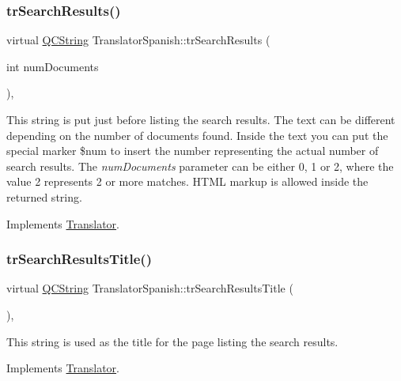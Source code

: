 \subsubsection{\texorpdfstring{trSearchResults()}{trSearchResults()}}
{\footnotesize\ttfamily virtual \mbox{\hyperlink{class_q_c_string}{Q\+C\+String}} Translator\+Spanish\+::tr\+Search\+Results (\begin{DoxyParamCaption}\item[{int}]{num\+Documents }\end{DoxyParamCaption})\hspace{0.3cm}{\ttfamily [inline]}, {\ttfamily [virtual]}}

This string is put just before listing the search results. The text can be different depending on the number of documents found. Inside the text you can put the special marker \$num to insert the number representing the actual number of search results. The {\itshape num\+Documents} parameter can be either 0, 1 or 2, where the value 2 represents 2 or more matches. H\+T\+ML markup is allowed inside the returned string. 

Implements \mbox{\hyperlink{class_translator}{Translator}}.

\mbox{\label{class_translator_spanish_aadf3653bbacc16fdc6980bfc17535cf3}} 
\subsubsection{\texorpdfstring{trSearchResultsTitle()}{trSearchResultsTitle()}}
{\footnotesize\ttfamily virtual \mbox{\hyperlink{class_q_c_string}{Q\+C\+String}} Translator\+Spanish\+::tr\+Search\+Results\+Title (\begin{DoxyParamCaption}{ }\end{DoxyParamCaption})\hspace{0.3cm}{\ttfamily [inline]}, {\ttfamily [virtual]}}

This string is used as the title for the page listing the search results. 

Implements \mbox{\hyperlink{class_translator}{Translator}}.

\mbox{\label{class_translator_spanish_a25bf91fc1608f7e228bfc0879c7f2bad}} 

